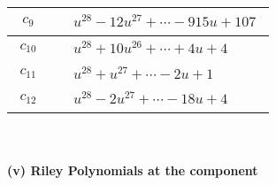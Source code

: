 \documentclass[1p]{elsarticle_modified}
\theoremstyle{definition}
\begin{document}
\begin{tabular}{m{50pt}|m{274pt}}
\hline $$\begin{aligned}c_{9}\end{aligned}$$&$\begin{aligned}
&u^{28}-12 u^{27}+\cdots-915 u+107
\end{aligned}$\\
\hline $$\begin{aligned}c_{10}\end{aligned}$$&$\begin{aligned}
&u^{28}+10 u^{26}+\cdots+4 u+4
\end{aligned}$\\
\hline $$\begin{aligned}c_{11}\end{aligned}$$&$\begin{aligned}
&u^{28}+u^{27}+\cdots-2 u+1
\end{aligned}$\\
\hline $$\begin{aligned}c_{12}\end{aligned}$$&$\begin{aligned}
&u^{28}-2 u^{27}+\cdots-18 u+4
\end{aligned}$\\
\hline
\end{tabular}\\~\\
\newpage\renewcommand{\arraystretch}{1}
\flushleft \textbf{(v) Riley Polynomials at the component}\newline \\
\end{document}
